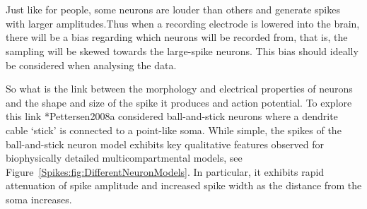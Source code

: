 \section{}
\label{Spikes:sec:ball-and-stick}

Just like for people, some neurons are louder than others and generate spikes with larger
amplitudes.Thus when a recording electrode is lowered into the brain, there will be a bias regarding which
neurons will be recorded from, that is, the sampling will be skewed towards the large-spike neurons.
This bias should ideally be considered when analysing the data.

So what is the link between the morphology and electrical properties of neurons and the shape and size of the spike it produces and action potential. To explore this link \citeasnoun**{Pettersen2008a} considered 
ball-and-stick neurons where a dendrite cable `stick' is connected to a point-like soma.
While simple, the spikes of the ball-and-stick neuron model exhibits key qualitative features 
observed for biophysically detailed multicompartmental models, 
see Figure~\ref{Spikes:fig:DifferentNeuronModels}.  In particular, it exhibits 
rapid attenuation of spike amplitude  and increased spike width as the distance from the soma increases.

